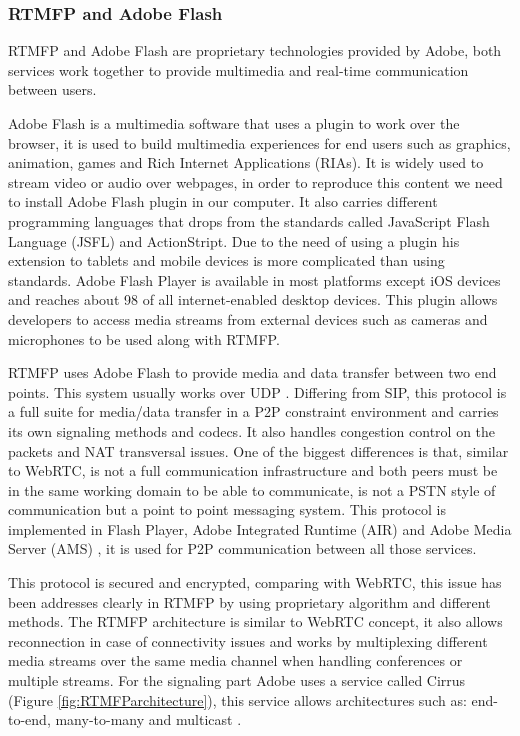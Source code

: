 \subsubsection{RTMFP and Adobe Flash}

RTMFP and Adobe Flash are proprietary technologies provided by Adobe, both services work together to provide multimedia and real-time communication between users.

Adobe Flash is a multimedia software that uses a plugin to work over the browser, it is used to build multimedia experiences for end users such as graphics, animation, games and Rich Internet Applications (RIAs). It is widely used to stream video or audio over webpages, in order to reproduce this content we need to install Adobe Flash plugin in our computer. It also carries different programming languages that drops from the standards called JavaScript Flash Language (JSFL) and ActionStript. Due to the need of using a plugin his extension to tablets and mobile devices is more complicated than using standards. Adobe Flash Player is available in most platforms except iOS devices and reaches about 98 of all internet-enabled desktop devices. This plugin allows developers to access media streams from external devices such as cameras and microphones to be used along with RTMFP.

RTMFP uses Adobe Flash to provide media and data transfer between two end points. This system usually works over UDP \cite{rtmfpDraft}. Differing from SIP, this protocol is a full suite for media/data transfer in a P2P constraint environment and carries its own signaling methods and codecs. It also handles congestion control on the packets and NAT transversal issues. One of the biggest differences is that, similar to WebRTC, is not a full communication infrastructure and both peers must be in the same working domain to be able to communicate, is not a PSTN style of communication but a point to point messaging system. This protocol is implemented in Flash Player, Adobe Integrated Runtime (AIR) and Adobe Media Server (AMS)  \cite{rtmfpDraft}, it is used for P2P communication between all those services. 

This protocol is secured and encrypted, comparing with WebRTC, this issue has been addresses clearly in RTMFP by using proprietary algorithm and different methods. The RTMFP architecture is similar to WebRTC concept, it also allows reconnection in case of connectivity issues and works by multiplexing different media streams over the same media channel when handling conferences or multiple streams. For the signaling part Adobe uses a service called Cirrus (Figure \ref{fig:RTMFParchitecture}), this service allows architectures such as: end-to-end, many-to-many and multicast \cite{cirrusFAQ}.
 
